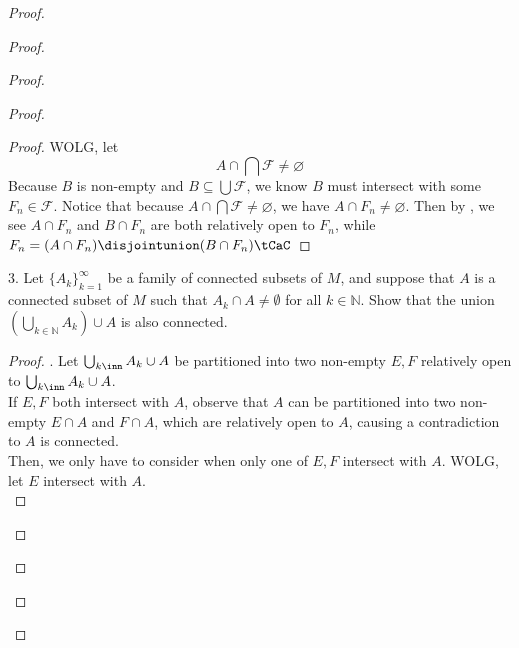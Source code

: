\documentclass{report}
\begin{document}
\begin{proof}
\begin{proof}
\begin{proof}
\begin{proof}
\begin{proof}
WOLG, let
\begin{equation*}
A\cap \bigcap \mathcal{F}\neq \varnothing
\end{equation*}
Because $B$ is non-empty and $B\subseteq \bigcup \mathcal{F}$, we know $B$ must intersect with some $F_n\in \mathcal{F}$. Notice that because $A\cap \bigcap \mathcal{F}\neq \varnothing$, we have $A\cap F_n\neq \varnothing$. Then by , we see $A\cap F_n$ and $B\cap F_n$ are both relatively open to $F_n$, while $F_n= (A\cap F_n)\disjointunion (B\cap F_n)\tCaC$ 
\end{proof}
\begin{question}{}{}
3. Let $\{A_k\}_{k=1}^{\infty}$ be a family of connected subsets of $M$, and suppose that $A$ is a connected subset of $M$ such that $A_k \cap A \neq \emptyset$ for all $k \in \mathbb{N}$. Show that the union $\left(\bigcup_{k \in \mathbb{N}} A_k\right) \cup A$ is also connected.
\end{question}
\begin{proof}
. Let $\bigcup_{k\inn}A_k\cup A$ be partitioned into two non-empty  $E,F$ relatively open to  $\bigcup_{k\inn}A_k\cup A$.\\

If $E,F$ both intersect with  $A$, observe that $A$ can be partitioned into two non-empty $E\cap A$ and $F\cap A$, which are relatively open to $A$, causing a contradiction to  $A$ is connected.\\

Then, we only have to consider when only one of  $E,F$ intersect with  $A$. WOLG, let  $E$ intersect with $A$.\\


\end{proof}
\end{proof}
\end{proof}
\end{proof}
\end{proof}
\end{document}
